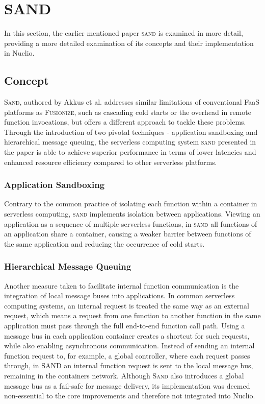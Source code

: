 \section{SAND}\label{sec:SAND}

In this section, the earlier mentioned paper \textsc{sand} is examined
in more detail, providing a more detailed examination of its concepts
and their implementation in Nuclio.

\subsection{Concept}
\textsc{Sand}, authored by Akkus et al. \cite{akkus2018sand} addresses
similar limitations of conventional FaaS platforms as \textsc{Fusionize}, 
such as cascading cold starts or the overhead in remote function invocations,
but offers a different approach to tackle these problems. Through the introduction
of two pivotal techniques - application sandboxing and hierarchical message queuing,
the serverless computing system \textsc{sand} presented in the paper is able to achieve
superior performance in terms of lower latencies and enhanced resource efficiency
compared to other serverless platforms.

\subsubsection{Application Sandboxing}
Contrary to the common practice of isolating each function within a container in
serverless computing, \textsc{sand} implements isolation between applications.
Viewing an application as a sequence of multiple serverless functions, in \textsc{sand}
all functions of an application share a container, causing a weaker barrier between
functions of the same application and reducing the occurrence of cold starts.

\subsubsection{Hierarchical Message Queuing}
Another measure taken to facilitate internal function communication is the integration
of local message buses into applications. In common serverless computing systems, an
internal request is treated the same way as an external request, which means a request
from one function to another function in the same application must pass through the
full end-to-end function call path. Using a message bus in each application container
creates a shortcut for such requests, while also enabling asynchronous communication.
Instead of sending an internal function request to, for example, a global controller,
where each request passes through, in SAND an internal function request is sent to the
local message bus, remaining in the containers network. Although \textsc{Sand} also
introduces a global message bus as a fail-safe for message delivery, its implementation
was deemed non-essential to the core improvements and therefore not integrated into Nuclio.

